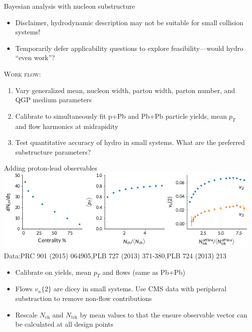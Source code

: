 \documentclass{beamer}
\begin{document}
\begin{frame}[t]{Bayesian analysis with nucleon substructure}
  \medskip
  {\large
  \begin{itemize}
    \item[\textcolor{pyred}{\faicon{warning}} \,] Disclaimer, hydrodynamic description may not be suitable for small collision systems!
      \bigskip
    \item[\textcolor{pyblue}{\faicon{commenting-o}} \,] Temporarily defer applicability questions to explore feasibility---would hydro ``even work''?
  \end{itemize}
  \medskip
  {\scshape \color{theme} Work flow:}
  \begin{enumerate}
    \item Vary generalized mean, nucleon width, parton width, parton number, and QGP medium parameters
    \item Calibrate to simultaneously fit p+Pb and Pb+Pb particle yields, mean $p_T$ and flow harmonics at midrapidity
    \item Test quantitative accuracy of hydro in small systems. What are the preferred substructure parameters?
  \end{enumerate}
  }%
\end{frame}

\begin{frame}[t]{Adding proton-lead observables}
  \vspace{.075\textheight}
  \includegraphics{observables} \\
    \centering
    {\tiny Data:\enskip PRC 901 (2015) 064905,\enskip PLB 727 (2013) 371-380,\enskip PLB 724 (2013) 213}
  \bigskip
  \begin{itemize}
    \item Calibrate on yields, mean $p_T$ and flows (same as Pb+Pb)
    \item Flows $v_n\{2\}$ are dicey in small systems. Use CMS data with peripheral substraction to remove non-flow contributions
    \item Rescale $N_\mathrm{ch}$ and $N_\mathrm{trk}$ by mean values to that the ensure observable vector can be calculated at all design points
  \end{itemize}
\end{frame}
\end{document}
